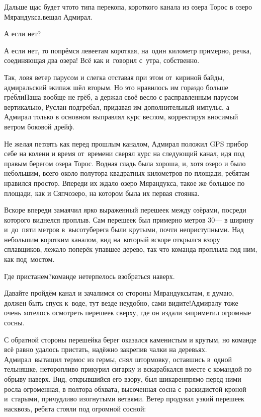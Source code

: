 \diagdash Дальше щас будет что\sdash то типа перекопа, короткого канала из озера Торос в озеро Мярандукса.\mdash вещал Адмирал.

\diagdash А если нет?

\diagdash А если нет, то попрёмся левее\mdash там короткая, на~один километр примерно, речка, соединяющая два озера! Всё как и~говорил с~утра, собственно.

Так, ловя ветер парусом и слегка отставая при этом от~кириной байды, адмиральский экипаж шёл вторым. Но это нравилось им гораздо больше гр{\'е}бли\mdash Паша вообще не грёб, а держал своё весло с расправленным парусом вертикально, Руслан подгребал, придавая им дополнительный импульс, а Адмирал только в основном выправлял курс веслом, корректируя вносимый ветром боковой дрейф.

Не желая петлять как перед прошлым каналом, Адмирал положил GPS прибор себе на колени и время от~времени сверял курс на следующий канал, идя под правым берегом озера Торос. Водная гладь была хороша, и, хотя озеро и было небольшим, всего около полутора квадратных километров по площади, ребятам нравился простор. Впереди их ждало озеро Мярандукса, такое же большое по площади, как и Сяпчозеро, на котором была их первая стоянка. 

Вскоре впереди замаячил ярко выраженный перешеек между озёрами, посреди которого виднелся проплыв. Сам перешеек был примерно метров 30\thinspace\nobreakdash--- в ширину и~до~пяти метров в~высоту\mdash берега были крутыми, почти неприступными. Над небольшим коротким каналом, вид на~который вскоре открылся взору сплавщиков, лежало поперёк упавшее дерево, так что команда проплыла под ним, как под~мостом.

\diagdash Где пристанем?\mdash команде нетерпелось взобраться наверх.

\diagdash Давайте пройдём канал и зачалимся со стороны Мярандуксы\mdash там, я думаю, должен быть спуск к~воде, тут везде неудобно, сами видите!\mdash Адмиралу тоже очень хотелось осмотреть перешеек сверху, где он издали заприметил огромные сосны.

С обратной стороны перешейка берег оказался каменистым и крутым, но команде всё равно удалось пристать, надёжно закрепив чалки на деревьях. Адмирал~вытащил термос из гермы, снял штормовку, оставшись в~одной тельняшке, неторопливо прикурил сигарку и вскарабкался вместе с командой по обрыву наверх. Вид, открывшийся его взору, был шикарен\mdash прямо перед ними росла огроменная, в полтора обхвата, высоченная сосна с~раскидистой кроной и~старыми, причудливо изогнутыми ветвями. Ветер продувал узкий перешеек насквозь, ребята стояли под огромной сосной:

